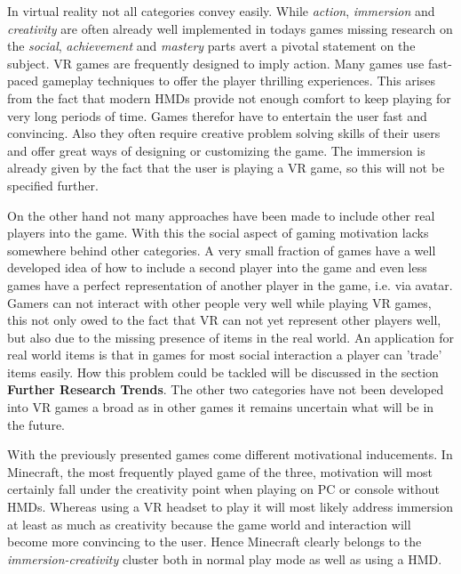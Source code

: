 \divider

In virtual reality not all categories convey easily. While \textit{action}, \textit{immersion} and \textit{creativity} are often already well implemented in todays games missing research on the \textit{social}, \textit{achievement} and \textit{mastery} parts avert a pivotal statement on the subject. \newline
VR games are frequently designed to imply action. Many games use fast-paced gameplay techniques to offer the player thrilling experiences. This arises from the fact that modern HMDs provide not enough comfort to keep playing for very long periods of time. Games therefor have to entertain the user fast and convincing. Also they often require creative problem solving skills of their users and offer great ways of designing or customizing the game.\newline
The immersion is already given by the fact that the user is playing a VR game, so this will not be specified further. 

On the other hand not many approaches have been made to include other real players into the game. With this the social aspect of gaming motivation lacks somewhere behind other categories. A very small fraction of games have a well developed idea of how to include a second player into the game and even less games have a perfect representation of another player in the game, i.e. via avatar. \newline
Gamers can not interact with other people very well while playing VR games, this not only owed to the fact that VR can not yet represent other players well, but also due to the missing presence of items in the real world. An application for real world items is that in games for most social interaction a player can 'trade' items easily. How this problem could be tackled will be discussed in the section \textbf{Further Research Trends}. \newline 
The other two categories have not been developed into VR games a broad as in other games it remains uncertain what will be in the future.

With the previously presented games come different motivational inducements. \newline
In Minecraft, the most frequently played game of the three, motivation will most certainly fall under the creativity point when playing on PC or console without HMDs. Whereas using a VR headset to play it will most likely address immersion at least as much as creativity because the game world and interaction will become more convincing to the user. Hence Minecraft clearly belongs to the \textit{immersion-creativity} cluster both in normal play mode as well as using a HMD.

